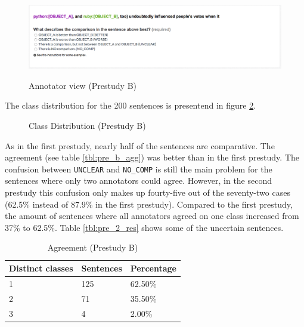 \begin{figure}[h]
\centering
\includegraphics[width=1\textwidth]{images/prestudy/2_question}
\label{img:2_question}
\caption{Annotator view (Prestudy B)}
\end{figure}

The class distribution for the 200 sentences is presentend in figure \ref{fig:dist_pre_b}. 

\begin{figure}[h]
\centering
\caption{Class Distribution (Prestudy B)}
\label{fig:dist_pre_b}
\end{figure}

As in the first prestudy, nearly half of the sentences are comparative. The agreement (see table \ref{tbl:pre_b_agg}) was better than in the first prestudy. The confusion between \texttt{UNCLEAR} and \texttt{NO\_COMP} is still the main problem for the sentences where only two annotators could agree. However, in the second prestudy this confusion only makes up fourty-five out of the seventy-two cases (62.5\% instead of 87.9\% in the first prestudy). Compared to the first prestudy, the amount of sentences where all annotators agreed on one class increased from 37\% to 62.5\%. Table \ref{tbl:pre_2_res} shows some of the uncertain sentences.

\begin{table}[h]
\caption{Agreement (Prestudy B)}
\label{fig:pre_b_agg}
\begin{tabularx}{\textwidth}{XXX}
\toprule
Distinct classes & Sentences & Percentage \\
\midrule
1 & 125 & 62.50\%\\
2 & 71 & 35.50\%\\
3 & 4 & 2.00\%\\
\bottomrule
\end{tabularx}
\end{table}


